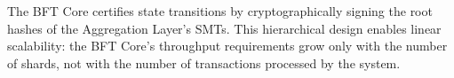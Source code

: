 The BFT Core certifies state transitions by cryptographically signing the root hashes of the Aggregation Layer's SMTs. This hierarchical design enables linear scalability: the BFT Core's throughput requirements grow only with the number of shards, not with the number of transactions processed by the system.
